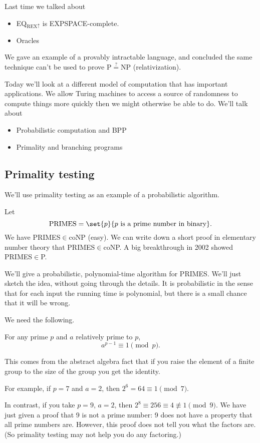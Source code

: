 
Last time we talked about
\begin{itemize}
\item
EQ${}_{\text{REX}\uparrow}$ is EXPSPACE-complete.
\item
Oracles
\end{itemize}
We gave an example of a provably intractable language, and concluded the same technique can't be used to prove P$\stackrel ?=$NP (relativization).

Today we'll look at a different model of computation that has important applications.
We allow Turing machines to access a source of randomness to compute things more quickly then we might otherwise be able to do.
We'll talk about
\begin{itemize}
\item Probabilistic computation and BPP
\item Primality and branching programs
\end{itemize}

\subsection{Primality testing}
We'll use primality testing as an example of a probabilistic algorithm.

Let
\[
\text{PRIMES}=\set{p}{p\text{ is a prime number in binary}}.
\]
We have PRIMES$\in$coNP (easy). 
We can write down a short proof in elementary number theory that PRIMES$\in$coNP. A big breakthrough in 2002 showed PRIMES$\in$P.

We'll give a probabilistic, polynomial-time algorithm for PRIMES. We'll just sketch the idea, without going through the details. It is probabilistic in the sense that for each input the running time is polynomial, but there is a small chance that it will be wrong. %

We need the following.
\begin{thm}
For any prime $p$ and $a$ relatively prime to $p$,
\[
a^{p-1}\equiv 1\pmod p.
\]
\end{thm}
This comes from the abstract algebra fact that if you raise the element of a finite group to the size of the group you get the identity.

For example, if $p=7$ and $a=2$, then $2^6=64\equiv 1\pmod 7$. %

In contrast, if you take $p=9$, $a=2$, then $2^8\equiv 256\equiv 4\nequiv 1\pmod 9$. We have just given a proof that 9 is not a prime number: 9 does not have a property that all prime numbers are. However, this proof does not tell you what the factors are. (So primality testing may not help you do any factoring.)

